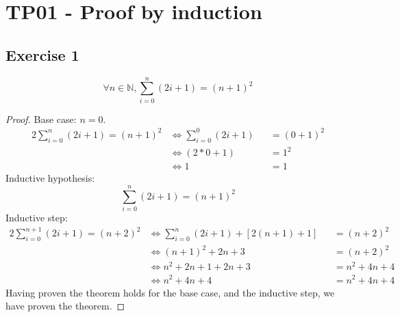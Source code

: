 \setcounter{section}{0}
\section{TP01 - Proof by induction}
\subsection{Exercise 1}
\begin{theorem}
	\begin{equation*}
		\forall n\in\mathbb{N},\sum_{i=0}^{n}{(2i+1)}=(n+1)^2
	\end{equation*}
\end{theorem}
\begin{proof}
	Base case: $n=0$.
\begin{alignat*}{2}
	\sum_{i=0}^{n}{(2i+1)}=(n+1)^2
	&\iff \sum_{i=0}^{0}{(2i+1)}&&=(0+1)^2 \\
    &\iff (2*0+1)               &&=1^2 \\
    &\iff 1                     &&=1
\end{alignat*}
Inductive hypothesis:
\begin{equation*}
	\sum_{i=0}^{n}{(2i+1)}=(n+1)^2
\end{equation*}
Inductive step:
\begin{alignat*}{2}
	\sum_{i=0}^{n+1}{(2i+1)}=(n+2)^2
	&\iff \sum_{i=0}^{n}{(2i+1)}+[2(n+1)+1]&&=(n+2)^2 \\
    &\iff (n+1)^2+2n+3                     &&=(n+2)^2 \\
    &\iff n^2+2n+1+2n+3                    &&=n^2+4n+4 \\
    &\iff n^2+4n+4                         &&=n^2+4n+4
\end{alignat*}
Having proven the theorem holds for the base case, and the inductive step, we have proven the theorem.
\end{proof}
\pagebreak
